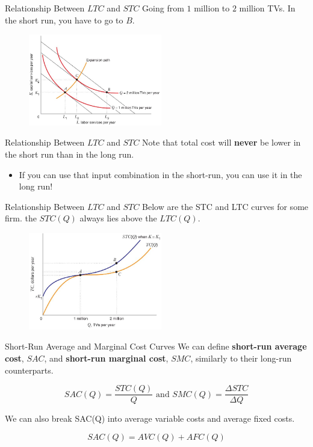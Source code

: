 \documentclass[11pt,t]{beamer}
\begin{document}
\begin{frame}{Relationship Between $LTC$ and $STC$}
  Going from $1$ million to $2$ million TVs. In the short run, you have to go to $B$. 
  \begin{figure}
    \includegraphics[width=220px]{figures/fig8_14.jpg}
  \end{figure}
\end{frame}

\begin{frame}{Relationship Between $LTC$ and $STC$}
  Note that total cost will \textbf{never} be lower in the short run than in the long run.

  \begin{itemize}
    \item If you can use that input combination in the short-run, you can use it in the long run!
  \end{itemize}
\end{frame}

\begin{frame}{Relationship Between $LTC$ and $STC$}
  Below are the STC and LTC curves for some firm. the $STC(Q)$ always lies above the $LTC(Q)$.
  \begin{figure}
    \includegraphics[width=220px]{figures/fig8_15.jpg}
  \end{figure}
\end{frame}

\begin{frame}{Short-Run Average and Marginal Cost Curves}
  We can define \textbf{short-run average cost}, $SAC$, and \textbf{short-run marginal cost}, $SMC$, similarly to their long-run counterparts.

  $$
    SAC(Q) = \frac{STC(Q)}{Q} \text{ and } 
    SMC(Q) = \frac{\Delta STC}{\Delta Q}
  $$

  \pause\bigskip
  We can also break SAC(Q) into average variable costs and average fixed costs.

  $$SAC(Q) = AVC(Q) + AFC(Q)$$
\end{frame}
\end{document}
